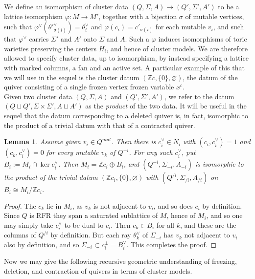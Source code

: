 \documentclass[11pt]{amsart}
\newtheorem{lem}[thm]{Lemma}
\theoremstyle{definition}
\theoremstyle{remark}
\newcommand{\Z}{\mathbb{Z}}
\renewcommand{\emptyset}{\varnothing}
\numberwithin{equation}{section}
\begin{document}
We define an isomorphism of cluster data $(Q,\Sigma,A)\to(Q',\Sigma',A')$ to be a lattice isomorphism $\varphi\colon M\to M'$, together with a bijection $\sigma$ of mutable vertices, such that $\varphi^\vee(\theta'^\vee_{\sigma(i)})=\theta_i^\vee$ and $\varphi(c_i)=c'_{\sigma(i)}$ for each mutable $v_i$, and such that $\varphi^\vee$ carries $\Sigma'$ and $A'$ onto $\Sigma$ and $A$. Such a $\varphi$ induces isomorphisms of toric varieties preserving the centers $H_i$, and hence of cluster models. We are therefore allowed to specify cluster data, up to isomorphism, by instead specifying a lattice with marked columns, a fan and an active set. A particular example of this that we will use in the sequel is the cluster datum $(\mathbb Zc,\{0\},\emptyset)$, the datum of the quiver consisting of a single frozen vertex frozen variable $x^c$.\\

Given two cluster data $(Q, \Sigma, A)$ and $(Q', \Sigma', A')$, we refer to the datum $(Q \sqcup Q', \Sigma \times \Sigma', A \sqcup A')$ as the \textit{product} of the two data. It will be useful in the sequel that the datum corresponding to a deleted quiver is, in fact, isomorphic to the product of a trivial datum with that of a contracted quiver.

\begin{lem}\label{product data decomposition}
Assume given $v_i \in Q^{mut}$. Then there is $c_i^\vee\in N_i$ with $(c_i,c_i^\vee)=1$ and $(c_k,c_i^\vee)=0$ for every mutable $v_k$ of $Q^{-i}$. For any such $c_i^\vee$, put $B_i:=M_i\cap\ker c_i^\vee$. Then $M_i=\Z c_i\oplus B_i$, and $(Q^{-i},\Sigma_{-i},A_{-i})$ is isomorphic to the product of the trivial datum $(\Z c_i,\{0\},\emptyset)$ with $(Q^{/i},\Sigma_{/i},A_{/i})$ on $B_i\cong M_i/\Z c_i$.
\end{lem}
 
\begin{proof}
The $c_k$ lie in $M_i$, as $v_k$ is not adjacent to $v_i$, and so does $c_i$ by definition. Since $Q$ is RFR they span a saturated sublattice of $M$, hence of $M_i$, and so one may simply take $c_i^\vee$ to be dual to $c_i$. Then $c_k\in B_i$ for all $k$, and these are the columns of $Q^{/i}$ by definition. But each ray $\theta_k^\vee$ of $\Sigma_{-i}$ has $v_k$ not adjacent to $v_i$ also by definition, and so $\Sigma_{-i}\subset c_i^\perp=B_i^\vee$. This completes the proof.
\end{proof}

Now we may give the following recursive geometric understanding of freezing, deletion, and contraction of quivers in terms of cluster models.
\end{document}
